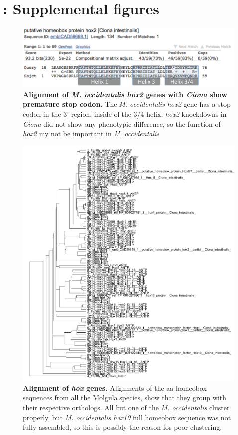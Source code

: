 \chapter{: Supplemental figures}
\begin{figure}[thbp]
\centering
\includegraphics[scale=0.75]{figures/occi_hox2.pdf}
\caption{\textbf{Alignment of \textit{M. occidentalis} \textit{hox2} genes with \textit{Ciona} show  premature stop codon.} The \textit{M. occidentalis hox2} gene has a stop codon in the 3' region, inside of the 3/4 helix. \textit{hox2} knockdowns in \textit{Ciona} did not show any phenotypic difference, so the function of \textit{hox2} my not be important in \textit{M. occidentalis} }
\label{fig:occihox2}
\end{figure}

\begin{figure}[tbp]
\centering
\includegraphics[scale=0.85]{figures/hox_alignment.pdf}
\caption{\textbf{Alignment of \textit{hox} genes.} Alignments of the aa homeobox sequences from all the Molgula species, show that they group with their respective orthologs. All but one of the \textit{M. occidentalis} cluster properly, but \textit{M. occidentalis hox10} full homeobox sequence was not fully assembled, so this is possibly the reason for poor clustering. }
\label{fig:hox-alignments}
\end{figure}

